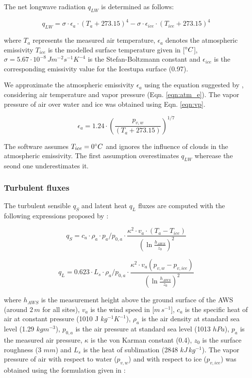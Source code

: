 \documentclass[utf8]{frontiersSCNS}
\begin{document}
The net longwave radiation $q_{LW}$ is determined as follows:

\begin{equation}
	q_{LW}= \sigma \cdot \epsilon_a \cdot {(T_a+ 273.15)}^4 -\sigma \cdot \epsilon_{ice} \cdot {(T_{ice}+ 273.15)}^4
	\label{eqn:LW}
\end{equation}

where $T_a$ represents the measured air temperature, $\epsilon_a$ denotes the atmospheric emissivity $T_{ice}$
is the modelled surface temperature given in [$\degree C$], $\sigma=5.67\cdot10^{-8}\,Jm^{-2}s^{-1}K^{-4}$ is
the Stefan-Boltzmann constant and $\epsilon_{ice}$ is the corresponding emissivity value for the Icestupa
surface (0.97).

We approximate the atmospheric emissivity $\epsilon_a$ using the equation suggested by \cite{Brutsaert_1975},
considering air temperature and vapor pressure (Eqn. \ref{eqn:atm_e}). The vapor pressure of air over water and
ice was obtained using Eqn. \ref{eqn:vp}.  

\begin{equation}
	\epsilon_a=1.24 \cdot (\frac{p_{v,w}}{(T_a+273.15)})^{1/7} \label{eqn:atm_e}
\end{equation}

The software assumes $T_{ice} = 0 \degree C$ and ignores the influence of clouds in the atmospheric emissivity.
The first assumption overestimates $q_{LW}$ wherease the seond one underestimates it.  

\subsubsection{Turbulent fluxes} \label{sec:Qs}

The turbulent sensible $q_{S}$ and latent heat $q_{L}$ fluxes are computed with the following expressions
proposed by \cite{Garratt_1992}:

\begin{equation}
	q_{S}= c_{a} \cdot \rho_{a} \cdot p_{a}/p_{0,a} \cdot \frac{\kappa^2 \cdot v_a \cdot
		(T_a-T_{ice})}{{(\ln{\frac{h_{AWS}}{z_{0}}})}^2}
	\label{eqn:qs}
\end{equation}

\begin{equation}
	q_{L}= 0.623 \cdot L_s \cdot \rho_{a}/p_{0,a} \cdot \frac{\kappa^2 \cdot
	v_a(p_{v,w}-p_{v,ice})}{{(\ln{\frac{h_{AWS}}{z_{0}}})}^2}
\end{equation}

where $h_{AWS}$ is the measurement height above the ground surface of the AWS (around $2\,m$ for all sites),
$v_a$ is the wind speed in [$m\,s^{-1}$], $c_a$ is the specific heat of air at constant pressure (1010 J
$kg^{-1} K^{-1}$), $\rho_{a}$ is the air density at standard sea level (1.29 $kg m^{-3}$), $p_{0,a}$ is the air
pressure at standard sea level (1013 $hPa$), $p_{a}$ is the measured air pressure, $\kappa$ is the von Karman
constant (0.4), $z_{0}$ is the surface roughness (3 $mm$) and $L_s$ is the heat of sublimation (2848
$kJ\,kg^{-1}$).  The vapor pressure of air with respect to water ($p_{v,w}$) and with respect to ice
($p_{v,ice}$) was obtained using the formulation given in \cite{huang_2018} :
\end{document}
